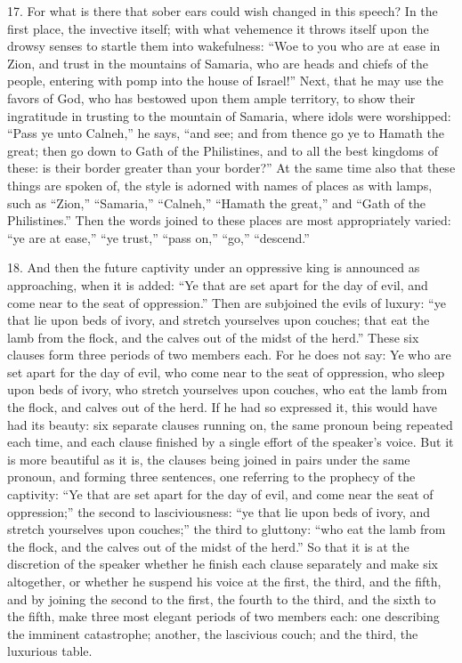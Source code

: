 17. For what is there that sober ears could wish changed in this speech? In the first place, the invective itself; with what vehemence it throws itself upon the drowsy senses to startle them into wakefulness: “Woe to you who are at ease in Zion, and trust in the mountains of Samaria, who are heads and chiefs of the people, entering with pomp into the house of Israel!” Next, that he may use the favors of God, who has bestowed upon them ample territory, to show their ingratitude in trusting to the mountain of Samaria, where idols were worshipped: “Pass ye unto Calneh,” he says, “and see; and from thence go ye to Hamath the great; then go down to Gath of the Philistines, and to all the best kingdoms of these: is their border greater than your border?” At the same time also that these things are spoken of, the style is adorned with names of places as with lamps, such as “Zion,” “Samaria,” “Calneh,” “Hamath the great,” and “Gath of the Philistines.” Then the words joined to these places are most appropriately varied: “ye are at ease,” “ye trust,” “pass on,” “go,” “descend.”

18. And then the future captivity under an oppressive king is announced as approaching, when it is added: “Ye that are set apart for the day of evil, and come near to the seat of oppression.” Then are subjoined the evils of luxury: “ye that lie upon beds of ivory, and stretch yourselves upon couches; that eat the lamb from the flock, and the calves out of the midst of the herd.” These six clauses form three periods of two members each. For he does not say: Ye who are set apart for the day of evil, who come near to the seat of oppression, who sleep upon beds of ivory, who stretch yourselves upon couches, who eat the lamb from the flock, and calves out of the herd. If he had so expressed it, this would have had its beauty: six separate clauses running on, the same pronoun being repeated each time, and each clause finished by a single effort of the speaker’s voice. But it is more beautiful as it is, the clauses being joined in pairs under the same pronoun, and forming three sentences, one referring to the prophecy of the captivity: “Ye that are set apart for the day of evil, and come near the seat of oppression;” the second to lasciviousness: “ye that lie upon beds of ivory, and stretch yourselves upon couches;” the third to gluttony: “who eat the lamb from the flock, and the calves out of the midst of the herd.” So that it is at the discretion of the speaker whether he finish each clause separately and make six altogether, or whether he suspend his voice at the first, the third, and the fifth, and by joining the second to the first, the fourth to the third, and the sixth to the fifth, make three most elegant periods of two members each: one describing the imminent catastrophe; another, the lascivious couch; and the third, the luxurious table.

